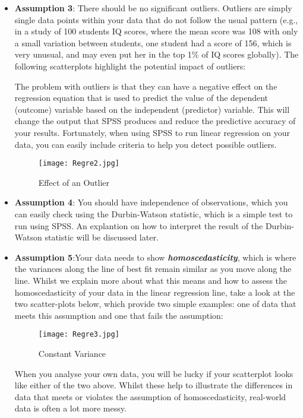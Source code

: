 \begin{itemize}
\item \textbf{Assumption 3}: There should be no significant outliers. Outliers are simply single data points within your data that do not follow the usual pattern (e.g., in a study of 100 students IQ scores, where the mean score was 108 with only a small variation between students, one student had a score of 156, which is very unusual, and may even put her in the top 1\% of IQ scores globally). The following scatterplots highlight the potential impact of outliers:

The problem with outliers is that they can have a negative effect on the regression equation that is used to predict the value of the dependent (outcome) variable based on the independent (predictor) variable. This will change the output that SPSS produces and reduce the predictive accuracy of your results. Fortunately, when using SPSS to run linear regression on your data, you can easily include criteria to help you detect possible outliers.
\begin{figure}[h!]
\begin{centering}
  \texttt{[image: Regre2.jpg]}\\
  \caption{Effect of an Outlier}
\end{centering}
\end{figure}
\item \textbf{Assumption 4}: You should have independence of observations, which you can easily check using the Durbin-Watson statistic, which is a simple test to run using SPSS. An explantion on how to interpret the result of the Durbin-Watson statistic will be discussed later.

\item \textbf{Assumption 5}:Your data needs to show \textbf{\textit{homoscedasticity}}, which is where the variances along the line of best fit remain similar as you move along the line. Whilst we explain more about what this means and how to assess the homoscedasticity of your data in the linear regression line, take a look at the two scatter-plots below, which provide two simple examples: one of data that meets this assumption and one that fails the assumption:

\begin{figure}[h!]
\begin{centering}
  \texttt{[image: Regre3.jpg]}\\
  \caption{Constant Variance}
\end{centering}
\end{figure}
When you analyse your own data, you will be lucky if your scatterplot looks like either of the two above. Whilst these help to illustrate the differences in data that meets or violates the assumption of homoscedasticity, real-world data is often a lot more messy.


\end{itemize}
